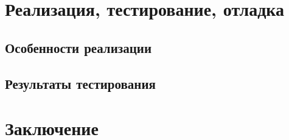   \section{Реализация, тестирование, отладка}

    \subsection{Особенности реализации}

    \subsection{Результаты тестирования}

  \section*{Заключение}


  \nocite{*}
  




